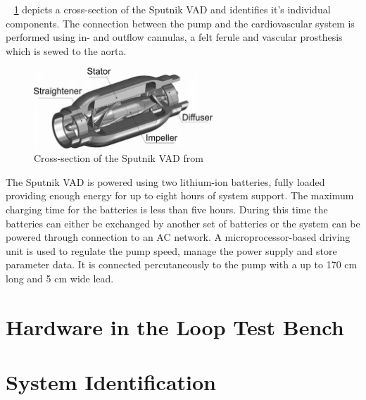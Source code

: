 \figurename~ \ref{fig:sput_cross} depicts a cross-section of the Sputnik VAD and identifies it's individual components.
The connection between the pump and the cardiovascular system is performed using in- and outflow cannulas, a felt ferule and vascular prosthesis which is sewed to the aorta. \cite{Sputnik1}
\begin{figure}[h]
  \centering
  \includegraphics[width=0.6\textwidth]{images/sputnik_cross.png}
  \caption{Cross-section of the Sputnik VAD from \cite{Sputnik6}}
  \label{fig:sput_cross}
\end{figure}
The Sputnik VAD is powered using two lithium-ion batteries, fully loaded providing enough energy for up to eight hours of system support. The maximum charging time for the batteries is less than five hours. During this time the batteries can either be exchanged by another set of batteries or the system can be powered through connection to an AC network. A microprocessor-based driving unit is used to regulate the pump speed, manage the power supply and store parameter data. It is connected percutaneously to the pump with a up to 170 cm long and 5 cm wide lead. \cite{Sputnik1}

\section{Hardware in the Loop Test Bench}

\section{System Identification}
